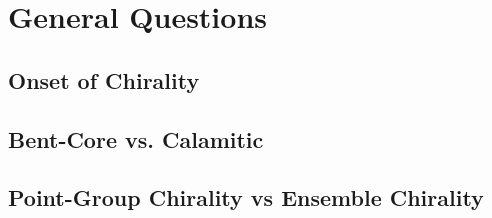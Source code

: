 \documentclass{tufte-handout}
\begin{document}
\section{General Questions}
\subsection{Onset of Chirality}
\subsection{Bent-Core vs. Calamitic} %
\subsection{Point-Group Chirality vs Ensemble Chirality}

\end{document}
